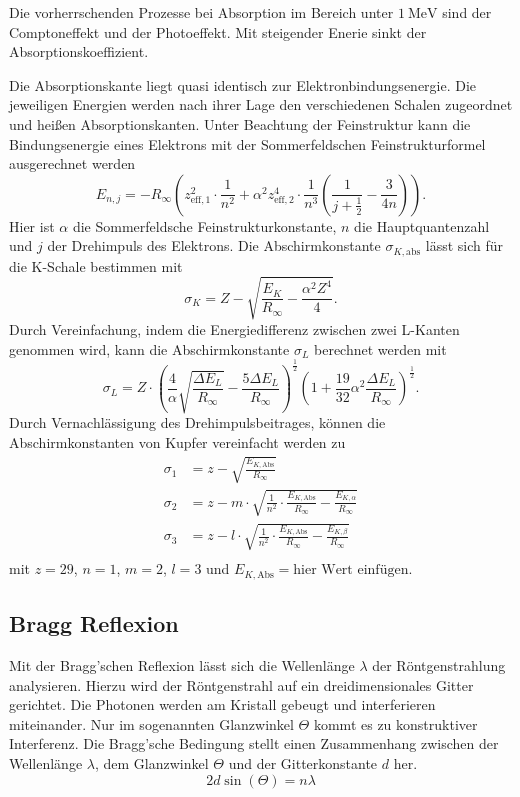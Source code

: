 Die vorherrschenden Prozesse bei Absorption im Bereich unter $\SI{1}{\mega\eV}$ sind der Comptoneffekt und
der Photoeffekt. Mit steigender Enerie sinkt der Absorptionskoeffizient.

Die Absorptionskante liegt quasi identisch zur Elektronbindungsenergie. Die jeweiligen Energien werden nach
ihrer Lage den verschiedenen Schalen zugeordnet und heißen Absorptionskanten.
Unter Beachtung der Feinstruktur kann die Bindungsenergie eines Elektrons mit der Sommerfeldschen Feinstrukturformel
ausgerechnet werden
\begin{equation*}\label{eq:Bindungsenergie_Sommerfeld}
    E_{n,j} = -R_\infty \left(z_{\text{eff},1}^2 \cdot \frac{1}{n^2} + α^2z_{\text{eff},2}^4 \cdot \frac{1}{n^3}\left(\frac{1}{j + \frac{1}{2}} - \frac{3}{4n}\right)\right).
\end{equation*}
Hier ist $α$ die Sommerfeldsche Feinstrukturkonstante, $n$ die Hauptquantenzahl und $j$ der Drehimpuls des Elektrons.
Die Abschirmkonstante $σ_{K,\text{abs}}$ lässt sich für die K-Schale bestimmen mit
\begin{equation*}\label{eq:Abschirmkonstante_K}
    σ_K = Z - \sqrt{\frac{E_K}{R_\infty} - \frac{α^2Z^4}{4}}.
\end{equation*}
Durch Vereinfachung, indem die Energiedifferenz zwischen zwei L-Kanten genommen wird, kann die Abschirmkonstante
$σ_L$ berechnet werden mit
\begin{equation*}\label{eq:Abschirmkonstante_L}
    σ_L = Z \cdot \left(\frac{4}{α}\sqrt{\frac{ΔE_L}{R_\infty}} - \frac{5ΔE_L}{R_{\infty}}\right)^{\frac{1}{2}}\left(1 + \frac{19}{32}α^2\frac{ΔE_L}{R_{\infty}}\right)^{\frac{1}{2}}.
\end{equation*}
Durch Vernachlässigung des Drehimpulsbeitrages, können die Abschirmkonstanten von Kupfer vereinfacht werden zu
\begin{align}\label{eq:sig}
    σ_1 &= z - \sqrt{\frac{E_{K,\text{Abs}}}{R_\infty}}\\
    σ_2 &= z - m \cdot \sqrt{\frac{1}{n^2} \cdot \frac{E_{K,\text{Abs}}}{R_\infty} - \frac{E_{K,α}}{R_\infty}}\\
    σ_3 &= z - l \cdot \sqrt{\frac{1}{n^2} \cdot \frac{E_{K,\text{Abs}}}{R_\infty} - \frac{E_{K,β}}{R_\infty}} \\
\end{align}
mit $z = 29$, $n = 1$, $m = 2$, $l = 3$ und $E_{K,\text{Abs}} = \text{hier Wert einfügen}$.

\subsection{Bragg Reflexion}
\label{sec:Bragg_Reflexion}
Mit der Bragg'schen Reflexion lässt sich die Wellenlänge $λ$ der Röntgenstrahlung analysieren.
Hierzu wird der Röntgenstrahl auf ein dreidimensionales Gitter gerichtet. Die Photonen werden am Kristall 
gebeugt und interferieren miteinander. Nur im sogenannten Glanzwinkel $\Theta$ kommt es zu konstruktiver Interferenz.
Die Bragg'sche Bedingung stellt einen Zusammenhang zwischen der Wellenlänge $λ$, dem Glanzwinkel $\Theta$ und der Gitterkonstante $d$ her.
\begin{equation}\label{eq:Bragg_Bedingung}
    2 d \sin(\Theta) = n λ
\end{equation}


